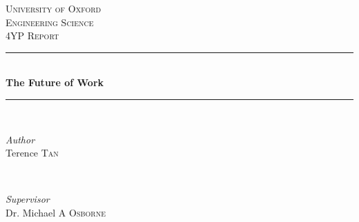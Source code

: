 \documentclass[11pt]{article}
\begin{document}
\begin{titlepage} %
	\newcommand{\HRule}{\rule{\linewidth}{0.5mm}} %
	
	\center %
	
	
	\textsc{\LARGE University of Oxford}\\[1.5cm] %
	
	\textsc{\Large Engineering Science}\\[0.5cm] %
	
	\textsc{\large 4YP Report}\\[0.5cm] %
	
	
	\HRule\\[0.4cm]
	
	{\huge\bfseries The Future of Work}\\[0.4cm] %
	
	\HRule\\[1.5cm]
	
	
	\begin{minipage}{0.4\textwidth}
		\begin{flushleft}
			\large
			\textit{Author}\\
			Terence \textsc{Tan} %
		\end{flushleft}
	\end{minipage}
	~
	\begin{minipage}{0.4\textwidth}
		\begin{flushright}
			\large
			\textit{Supervisor}\\
			Dr. Michael A \textsc{Osborne} %
		\end{flushright}
	\end{minipage}
	
	

\end{titlepage}
\end{document}
